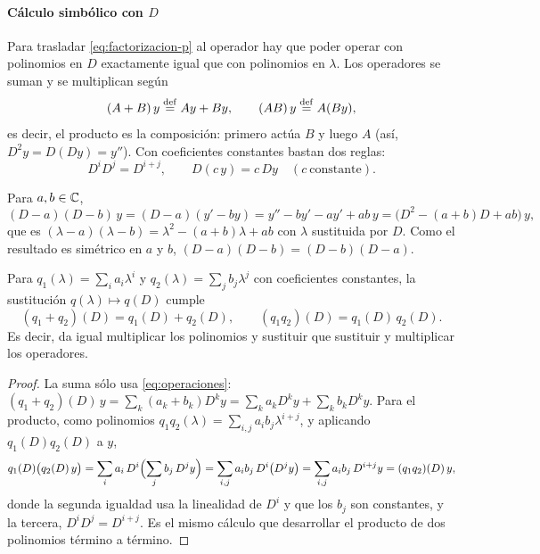 \paragraph{Cálculo simbólico con $D$}
Para trasladar \eqref{eq:factorizacion-p} al operador hay que poder operar
con polinomios en $D$ exactamente igual que con polinomios en $\lambda$.
Los operadores se suman y se multiplican según
\begin{equation}\label{eq:operaciones}
  (A+B)\,y\mathrel{\overset{\mathrm{def}}{=}} Ay+By,\qquad (AB)\,y\mathrel{\overset{\mathrm{def}}{=}} A(By),
\end{equation}
es decir, el producto es la composición: primero actúa $B$ y luego $A$ (así,
$D^{2}y=D(Dy)=y''$). Con coeficientes constantes bastan dos reglas:
\begin{equation}\label{eq:reglas}
  D^{i}D^{j}=D^{i+j},\qquad D(c\,y)=c\,Dy\quad(c\ \text{constante}).
\end{equation}

\begin{ejemplo}\label{ej:dos-factores}
Para $a,b\in\mathbb{C}$,
\[
  (D-a)(D-b)\,y=(D-a)(y'-by)=y''-by'-ay'+ab\,y=\bigl(D^{2}-(a+b)D+ab\bigr)\,y ,
\]
que es $(\lambda-a)(\lambda-b)=\lambda^{2}-(a+b)\lambda+ab$ con $\lambda$
sustituida por $D$. Como el resultado es simétrico en $a$ y $b$,
$(D-a)(D-b)=(D-b)(D-a)$.
\end{ejemplo}

\begin{lema}[Polinomios en $D$]\label{lem:polinomios-D}
Para $q_1(\lambda)=\sum_ia_i\lambda^{i}$ y $q_2(\lambda)=\sum_jb_j\lambda^{j}$ con
coeficientes constantes, la sustitución $q(\lambda)\mapsto q(D)$ cumple
\begin{equation}\label{eq:homomorfismo}
  (q_1+q_2)(D)=q_1(D)+q_2(D),\qquad (q_1q_2)(D)=q_1(D)\,q_2(D).
\end{equation}
Es decir, da igual multiplicar los polinomios y sustituir que sustituir y
multiplicar los operadores.
\end{lema}

\begin{proof}
La suma sólo usa \eqref{eq:operaciones}:
$(q_1+q_2)(D)\,y=\sum_k(a_k+b_k)D^{k}y=\sum_ka_kD^{k}y+\sum_kb_kD^{k}y$.
Para el producto, como polinomios $q_1q_2(\lambda)=\sum_{i,j}a_ib_j\lambda^{i+j}$,
y aplicando $q_1(D)q_2(D)$ a $y$,
\[
  q_1(D)\bigl(q_2(D)\,y\bigr)
  =\sum_ia_i\,D^{i}\Bigl(\sum_jb_j\,D^{j}y\Bigr)
  =\sum_{i,j}a_ib_j\,D^{i}\bigl(D^{j}y\bigr)
  =\sum_{i,j}a_ib_j\,D^{i+j}y=(q_1q_2)(D)\,y ,
\]
donde la segunda igualdad usa la linealidad de $D^{i}$ y que los $b_j$ son
constantes, y la tercera, $D^{i}D^{j}=D^{i+j}$. Es el mismo cálculo que
desarrollar el producto de dos polinomios término a término.
\end{proof}

